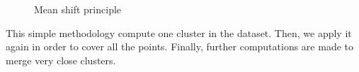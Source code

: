 \begin{figure}[h!]
{}
\caption{Mean shift principle\label{shif}}
\end{figure}

This simple methodology compute one cluster in the dataset. Then, we apply it again in order to cover all the points. Finally, further computations are made to merge very close clusters.

